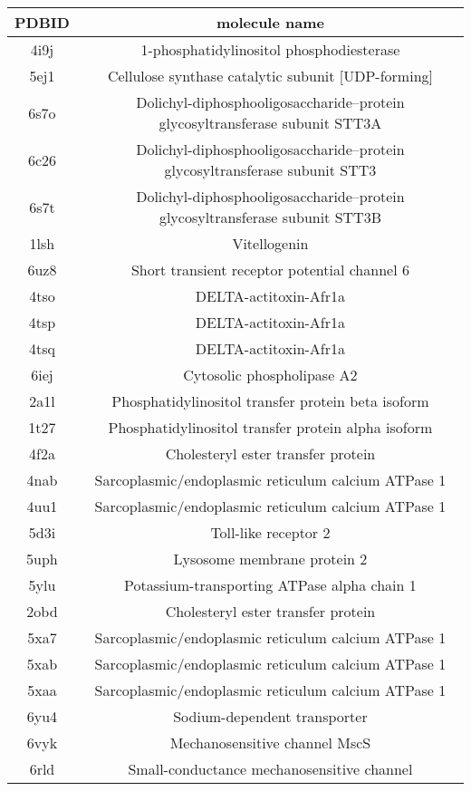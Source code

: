 \documentclass{article}
\begin{document}
\begin{table}[]
    \centering
    \begin{tabular}{c|c}
PDBID & molecule name \\
\hline
4i9j & 1-phosphatidylinositol phosphodiesterase \\ 
5ej1 & Cellulose synthase catalytic subunit [UDP-forming] \\ 
6s7o & Dolichyl-diphosphooligosaccharide--protein glycosyltransferase subunit STT3A \\ 
6c26 & Dolichyl-diphosphooligosaccharide--protein glycosyltransferase subunit STT3 \\ 
6s7t & Dolichyl-diphosphooligosaccharide--protein glycosyltransferase subunit STT3B \\ 
1lsh & Vitellogenin \\ 
6uz8 & Short transient receptor potential channel 6 \\ 
4tso & DELTA-actitoxin-Afr1a \\ 
4tsp & DELTA-actitoxin-Afr1a \\ 
4tsq & DELTA-actitoxin-Afr1a \\ 
6iej & Cytosolic phospholipase A2 \\ 
2a1l & Phosphatidylinositol transfer protein beta isoform \\ 
1t27 & Phosphatidylinositol transfer protein alpha isoform \\ 
4f2a & Cholesteryl ester transfer protein \\ 
4nab & Sarcoplasmic/endoplasmic reticulum calcium ATPase 1 \\ 
4uu1 & Sarcoplasmic/endoplasmic reticulum calcium ATPase 1 \\ 
5d3i & Toll-like receptor 2 \\ 
5uph & Lysosome membrane protein 2 \\ 
5ylu & Potassium-transporting ATPase alpha chain 1 \\ 
2obd & Cholesteryl ester transfer protein \\ 
5xa7 & Sarcoplasmic/endoplasmic reticulum calcium ATPase 1 \\ 
5xab & Sarcoplasmic/endoplasmic reticulum calcium ATPase 1 \\ 
5xaa & Sarcoplasmic/endoplasmic reticulum calcium ATPase 1 \\ 
6yu4 & Sodium-dependent transporter \\ 
6vyk & Mechanosensitive channel MscS \\ 
6rld & Small-conductance mechanosensitive channel \\ 

\end{tabular}
\end{table}
\end{document}
